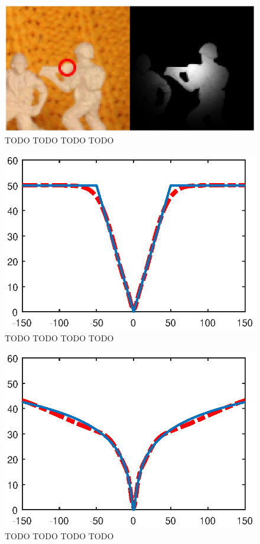 \documentclass[10pt,twocolumn,letterpaper]{article}
\begin{document}
\begin{figure}[t]
\begin{center}
   \includegraphics[width=.8\linewidth]{figs/nonLocalWieght.jpg}
\end{center}
   \caption{TODO TODO TODO TODO}
\label{fig:structure}
\end{figure}

\begin{figure}[t]
\begin{center}
   \includegraphics[width=0.8\linewidth]{figs/penalty_l1Norm.eps}
\end{center}
   \caption{TODO TODO TODO TODO}
\label{fig:structure}
\end{figure}

\begin{figure}[t]
\begin{center}
   \includegraphics[width=0.8\linewidth]{figs/penalty_Lorentzian.eps}
\end{center}
   \caption{TODO TODO TODO TODO}
\label{fig:structure}
\end{figure}
\end{document}
